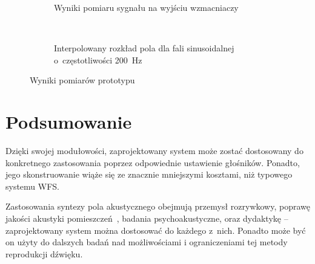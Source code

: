 \documentclass[10pt, a4paper]{article}
\let\Oldsection\section
\renewcommand{\section}{\FloatBarrier\Oldsection}
\begin{document}
\begin{figure}[!tbh]
\centering
\begin{subfigure}[b]{.49\textwidth}
\centering
\caption{Wyniki pomiaru sygnału na wyjściu wzmacniaczy}
\label{r:pomiar_el}
\end{subfigure}
~
\begin{subfigure}[b]{.49\textwidth}
\centering
\caption{Interpolowany rozkład pola dla fali sinusoidalnej o~częstotliwości \SI{200}{\hertz}}
\label{r:pomiar_kb}
\end{subfigure}
\caption{Wyniki pomiarów prototypu}
\end{figure}

\section{Podsumowanie}

Dzięki swojej modułowości, zaprojektowany system może zostać dostosowany do 
konkretnego zastosowania poprzez odpowiednie ustawienie głośników. Ponadto,
jego skonstruowanie wiąże się ze znacznie mniejszymi kosztami, niż typowego
systemu WFS.

Zastosowania syntezy pola akustycznego obejmują przemysł rozrywkowy, poprawę
jakości akustyki pomieszczeń~\cite{enhancement}, badania psychoakustyczne,
oraz dydaktykę -- zaprojektowany system można dostosować do każdego z~nich.
Ponadto może być on użyty do dalszych badań nad możliwościami i ograniczeniami
tej metody reprodukcji dźwięku.

\printbibliography
\end{document}
